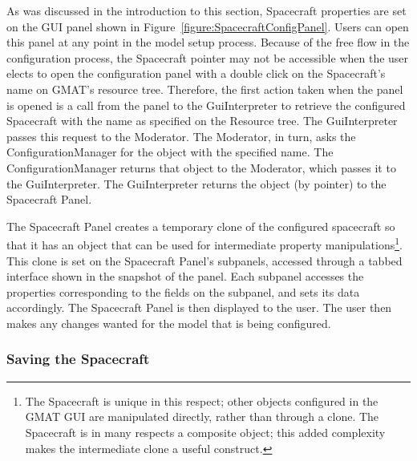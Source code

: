 As was discussed in the introduction to this section, Spacecraft properties are set on the GUI panel
shown in Figure~\ref{figure:SpacecraftConfigPanel}.  Users can open this panel at any point in the
model setup process.  Because of the free flow in the configuration process, the Spacecraft pointer
may not be accessible when the user elects to open the configuration panel with a double click on
the Spacecraft's name on GMAT's resource tree.  Therefore, the first action taken when the panel is
opened is a call from the panel to the GuiInterpreter to retrieve the configured Spacecraft with the
name as specified on the Resource tree.  The GuiInterpreter passes this request to the Moderator.
The Moderator, in turn, asks the ConfigurationManager for the object with the specified name.  The
ConfigurationManager returns that object to the Moderator, which passes it to the GuiInterpreter.
The GuiInterpreter returns the object (by pointer) to the Spacecraft Panel.

The Spacecraft Panel creates a temporary clone of the configured spacecraft so that it has an object
that can be used for intermediate property manipulations\footnote{The Spacecraft is unique in this
respect; other objects configured in the GMAT GUI are manipulated directly, rather than through a
clone.  The Spacecraft is in many respects a composite object; this added complexity makes the
intermediate clone a useful construct.}.  This clone is set on the Spacecraft Panel's subpanels,
accessed through a tabbed interface shown in the snapshot of the panel.  Each subpanel accesses the
properties corresponding to the fields on the subpanel, and sets its data accordingly. The
Spacecraft Panel is then displayed to the user.  The user then makes any changes wanted for the
model that is being configured.

\subsubsection{\label{section:ObjectPersistance}Saving the Spacecraft}

